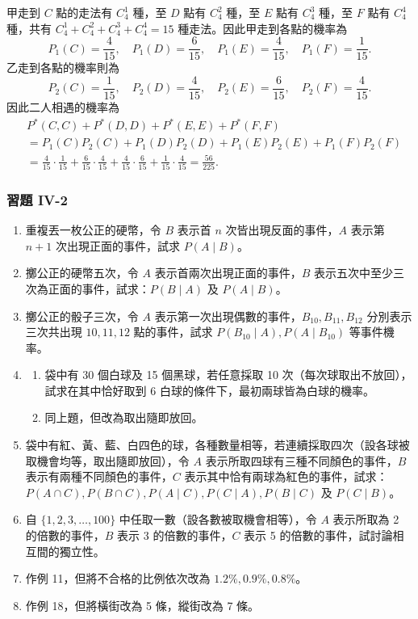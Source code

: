 \medskip
\noindent 甲走到 $C$ 點的走法有 $C^1_4$ 種，至 $D$ 點有 $C^2_4$ 種，至 $E$ 點有 $C^3_4$ 種，至 $F$ 點有 $C^4_4$ 種，共有 $C^1_4 + C^2_4 + C^3_4 + C^4_4 = 15$ 種走法。因此甲走到各點的機率為
\[
P_1(C) = \frac{4}{15}, \quad P_1(D) = \frac{6}{15}, \quad P_1(E) = \frac{4}{15}, \quad P_1(F) = \frac{1}{15}.
\]
乙走到各點的機率則為
\[
P_2(C) = \frac{1}{15}, \quad P_2(D) = \frac{4}{15}, \quad P_2(E) = \frac{6}{15}, \quad P_2(F) = \frac{4}{15}.
\]
因此二人相遇的機率為
\begin{align*}
& P^*(C, C) + P^*(D, D) + P^*(E, E) + P^*(F, F) \\
&= P_1(C)P_2(C) + P_1(D)P_2(D) + P_1(E)P_2(E) + P_1(F)P_2(F) \\
&= \frac{4}{15} \cdot \frac{1}{15} + \frac{6}{15} \cdot \frac{4}{15} + \frac{4}{15} \cdot \frac{6}{15} + \frac{1}{15} \cdot \frac{4}{15} = \frac{56}{225}. \tag*{\#}
\end{align*}

\vspace{1.5em}
\subsubsection*{習題 IV-2}\label{sec:b5s-ex4-2}

\begin{enumerate}[label=\textbf{\arabic*.}]
  \item 重複丟一枚公正的硬幣，令 $B$ 表示首 $n$ 次皆出現反面的事件，$A$ 表示第 $n+1$ 次出現正面的事件，試求 $P(A\mid B)$。
  \item 擲公正的硬幣五次，令 $A$ 表示首兩次出現正面的事件，$B$ 表示五次中至少三次為正面的事件，試求：$P(B\mid A)$ 及 $P(A\mid B)$。
  \item 擲公正的骰子三次，令 $A$ 表示第一次出現偶數的事件，$B_{10}, B_{11}, B_{12}$ 分別表示三次共出現 $10, 11, 12$ 點的事件，試求 $P(B_{10}\mid A), P(A\mid B_{10})$ 等事件機率。
  \item 
  \begin{enumerate}[label=(\arabic*)]
    \item 袋中有 30 個白球及 15 個黑球，若任意採取 10 次（每次球取出不放回），試求在其中恰好取到 6 白球的條件下，最初兩球皆為白球的機率。
    \item 同上題，但改為取出隨即放回。
  \end{enumerate}
  \item 袋中有紅、黃、藍、白四色的球，各種數量相等，若連續採取四次（設各球被取機會均等，取出隨即放回），令 $A$ 表示所取四球有三種不同顏色的事件，$B$ 表示有兩種不同顏色的事件，$C$ 表示其中恰有兩球為紅色的事件，試求：$P(A \cap C), P(B \cap C), P(A\mid C), P(C\mid A), P(B\mid C)$ 及 $P(C\mid B)$。
  \item 自 $\{1, 2, 3, \dots, 100\}$ 中任取一數（設各數被取機會相等），令 $A$ 表示所取為 2 的倍數的事件，$B$ 表示 3 的倍數的事件，$C$ 表示 5 的倍數的事件，試討論相互間的獨立性。
  \item 作例 11，但將不合格的比例依次改為 $1.2\%, 0.9\%, 0.8\%$。
  \item 作例 18，但將橫街改為 5 條，縱街改為 7 條。
\end{enumerate}

